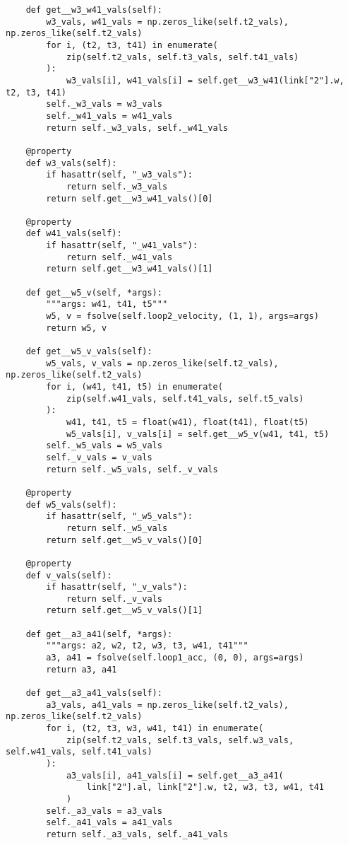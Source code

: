 \documentclass[12pt]{article}
\begin{document}
\begin{lstlisting}
    def get__w3_w41_vals(self):
        w3_vals, w41_vals = np.zeros_like(self.t2_vals), np.zeros_like(self.t2_vals)
        for i, (t2, t3, t41) in enumerate(
            zip(self.t2_vals, self.t3_vals, self.t41_vals)
        ):
            w3_vals[i], w41_vals[i] = self.get__w3_w41(link["2"].w, t2, t3, t41)
        self._w3_vals = w3_vals
        self._w41_vals = w41_vals
        return self._w3_vals, self._w41_vals

    @property
    def w3_vals(self):
        if hasattr(self, "_w3_vals"):
            return self._w3_vals
        return self.get__w3_w41_vals()[0]

    @property
    def w41_vals(self):
        if hasattr(self, "_w41_vals"):
            return self._w41_vals
        return self.get__w3_w41_vals()[1]

    def get__w5_v(self, *args):
        """args: w41, t41, t5"""
        w5, v = fsolve(self.loop2_velocity, (1, 1), args=args)
        return w5, v

    def get__w5_v_vals(self):
        w5_vals, v_vals = np.zeros_like(self.t2_vals), np.zeros_like(self.t2_vals)
        for i, (w41, t41, t5) in enumerate(
            zip(self.w41_vals, self.t41_vals, self.t5_vals)
        ):
            w41, t41, t5 = float(w41), float(t41), float(t5)
            w5_vals[i], v_vals[i] = self.get__w5_v(w41, t41, t5)
        self._w5_vals = w5_vals
        self._v_vals = v_vals
        return self._w5_vals, self._v_vals

    @property
    def w5_vals(self):
        if hasattr(self, "_w5_vals"):
            return self._w5_vals
        return self.get__w5_v_vals()[0]

    @property
    def v_vals(self):
        if hasattr(self, "_v_vals"):
            return self._v_vals
        return self.get__w5_v_vals()[1]

    def get__a3_a41(self, *args):
        """args: a2, w2, t2, w3, t3, w41, t41"""
        a3, a41 = fsolve(self.loop1_acc, (0, 0), args=args)
        return a3, a41

    def get__a3_a41_vals(self):
        a3_vals, a41_vals = np.zeros_like(self.t2_vals), np.zeros_like(self.t2_vals)
        for i, (t2, t3, w3, w41, t41) in enumerate(
            zip(self.t2_vals, self.t3_vals, self.w3_vals, self.w41_vals, self.t41_vals)
        ):
            a3_vals[i], a41_vals[i] = self.get__a3_a41(
                link["2"].al, link["2"].w, t2, w3, t3, w41, t41
            )
        self._a3_vals = a3_vals
        self._a41_vals = a41_vals
        return self._a3_vals, self._a41_vals


\end{lstlisting}
\end{document}
